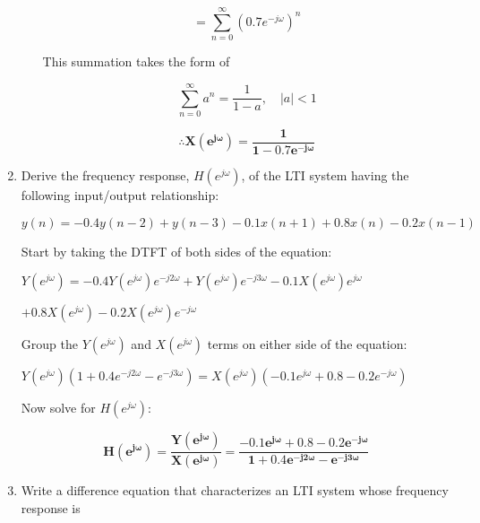 \documentclass[fleqn]{article}
\begin{document}
\begin{enumerate}[nolistsep]
\begin{enumerate}[nolistsep]
					\begin{equation*}
						= \sum_{n=0}^{\infty}(0.7e^{-j{\omega}})^n
					\end{equation*}
					
					This summation takes the form of
					
					\begin{equation*}
						\sum_{n=0}^{\infty}a^n = \frac{1}{1-a},\quad |a| < 1
					\end{equation*}
					
					\begin{equation*}
						\mathbf{\therefore X(e^{j\omega}) = \frac{1}{1 - 0.7e^{-j\omega}}}
					\end{equation*}
			\end{enumerate}
		
		\pagebreak
		\item Derive the frequency response, $H(e^{j\omega})$, of the LTI system having the following input/output relationship:
		
			$y(n) = -0.4y(n-2)+y(n-3)-0.1x(n+1)+0.8x(n)-0.2x(n-1)$
			
			Start by taking the DTFT of both sides of the equation:
			
			$Y(e^{j\omega}) = -0.4Y(e^{j\omega})e^{-j2\omega}+Y(e^{j\omega})e^{-j3\omega}-0.1X(e^{j\omega})e^{j\omega}$
			
			$+0.8X(e^{j\omega})-0.2X(e^{j\omega})e^{-j\omega}$
			
			Group the $Y(e^{j\omega})$ and $X(e^{j\omega})$ terms on either side of the equation:
			
			$Y(e^{j\omega})(1 + 0.4e^{-j2\omega} - e^{-j3\omega}) = X(e^{j\omega})(-0.1e^{j\omega} + 0.8 - 0.2e^{-j\omega})$
			
			Now solve for $H(e^{j\omega})$:
			
			\begin{equation*}
				\mathbf{H(e^{j\omega}) = \frac{Y(e^{j\omega})}{X(e^{j\omega})} = \frac{-0.1e^{j\omega} + 0.8 - 0.2e^{-j\omega}}{1 + 0.4e^{-j2\omega} - e^{-j3\omega}}}
			\end{equation*}
		\item Write a difference equation that characterizes an LTI system whose frequency response is
		
			\begin{equation*}
				
			\end{equation*}
	\end{enumerate}
\end{document}
